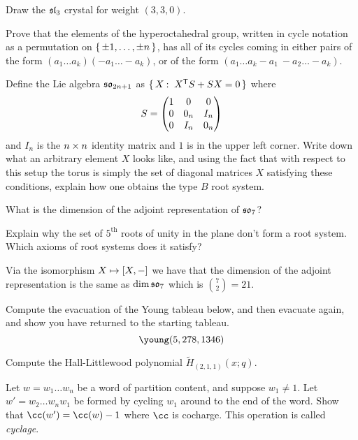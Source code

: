 \documentclass[12pt]{memoir}
\begin{document}
\begin{Ej}
Draw the $\mathfrak{sl}_3$ crystal for weight $(3,3,0)$.
\end{Ej}

\begin{Ej}
    Prove that the elements of the hyperoctahedral group, written in cycle notation as a permutation on $\{\,\pm1,\dots , \pm n\,\}$, has all of its cycles coming in either pairs of the form $(a_1\dots a_k)(-a_1\dots -a_k)$, or of the form $(a_1\dots a_k -a_1\ -a_2\dots-a_k)$.
\end{Ej}

\begin{Ej}
    Define the Lie algebra $\mathfrak{so}_{2n+1}$ as $\{\,X\mathbin{:}\ X^{\mathsf{T}} S+SX=0\,\}$ where 
    $$S=\begin{pmatrix} 1 & 0 & 0 \\ 0 & 0_n & I_n \\ 0 & I_n & 0_n \end{pmatrix}$$
    and $I_n$ is the $n\times n$ identity matrix and $1$ is in the upper left corner. Write down what an arbitrary element $X$ looks like, and using the fact that with respect to this setup the torus is simply the set of diagonal matrices $X$ satisfying these conditions, explain how one obtains the type $B$ root system.
\end{Ej}

\begin{Ej}
    What is the dimension of the adjoint representation of $\mathfrak{so}_7$?
\end{Ej}

\begin{Ej}
    Explain why the set of $5^{\text{th}}$ roots of unity in the plane don't form a root system. Which axioms of root systems does it satisfy?
\end{Ej}

\begin{ptcbr}
    Via the isomorphism $X\mapsto\left\lbrack X,-\right\rbrack$ we have that the dimension of the adjoint representation is the same as $\dim\mathfrak{so}_7$ which is $\binom{7}{2}=21$.
\end{ptcbr}

\begin{Ej}
    Compute the evacuation of the Young tableau below, and then evacuate again, and show you have returned to the starting tableau.
    $$\young(5,278,1346)$$
\end{Ej}

\begin{Ej}
    Compute the Hall-Littlewood polynomial $\tilde{H}_{(2,1,1)}(x;q)$.
\end{Ej}

\begin{Ej}
    Let $w=w_1\dots w_n$ be a word of partition content, and suppose $w_1\neq 1$. Let $w'=w_2\dots w_nw_1$ be formed by cycling $w_1$ around to the end of the word. Show that $\cc(w')=\cc(w)-1$ where $\cc$ is cocharge. This operation is called \emph{cyclage}.
\end{Ej}
\end{document}
